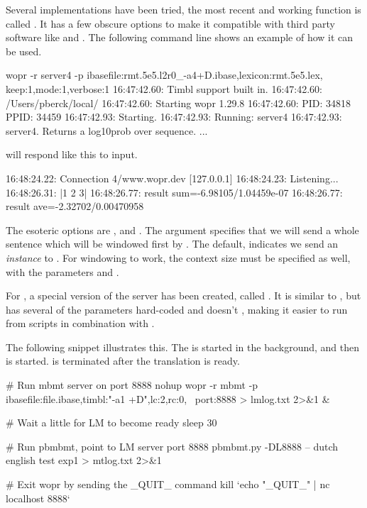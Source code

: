 \documentclass[a4paper,10pt,twoside]{report}
\begin{document}
Several implementations have been tried, the most recent and working
function is called . It has a few obscure options to make
it compatible with third party software like  and
\pbmbmt{}. The following command line shows an example of how it
can be used.

\begin{bash}{}

wopr -r server4 -p ibasefile:rmt.5e5.l2r0_-a4+D.ibase,lexicon:rmt.5e5.lex,
                   keep:1,mode:1,verbose:1
16:47:42.60: Timbl support built in.
16:47:42.60: /Users/pberck/local/
16:47:42.60: Starting wopr 1.29.8
16:47:42.60: PID:  34818 PPID:  34459
16:47:42.93: Starting.
16:47:42.93: Running: server4
16:47:42.93: server4. Returns a log10prob over sequence.
...
\end{bash}

\Wopr{} will respond like this to input.

\begin{wout}{}
16:48:24.22: Connection 4/www.wopr.dev [127.0.0.1]
16:48:24.23: Listening...
16:48:26.31: |1 2 3|
16:48:26.77: result sum=-6.98105/1.04459e-07
16:48:26.77: result ave=-2.32702/0.00470958
\end{wout}

The esoteric options are , and . The  argument
specifies that we will send a whole sentence which will be windowed first by
\wopr{}. The default,  indicates we send an \emph{instance} to
\wopr{}. For windowing to work, the context size must be specified as well, with
the parameters  and .

For \pbmbmt{}, a special version of the server has been created,
called . It is similar to , but has several of
the parameters hard-coded and doesn't , making it easier to
run from scripts in combination with \pbmbmt{}.

The following snippet illustrates this. The \wopr{} \lm{} is started
in the background, and then \pbmbmt{} is started. \Wopr{} is
terminated after the translation is ready.

\begin{bash}{}
# Run mbmt server on port 8888
nohup wopr -r mbmt -p ibasefile:file.ibase,timbl:"-a1 +D",lc:2,rc:0, \
    port:8888 > lmlog.txt 2>&1 &

# Wait a little for LM to become ready
sleep 30

# Run pbmbmt, point to LM server port 8888
pbmbmt.py -DL8888 -- dutch english test exp1 > mtlog.txt 2>&1

# Exit wopr by sending the _QUIT_ command 
kill `echo "_QUIT_" | nc localhost 8888`
\end{bash}
\end{document}
